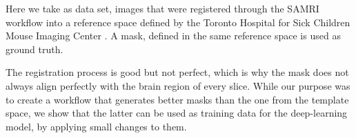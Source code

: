 Here we take as data set, images that were registered through the SAMRI workflow into a reference space defined by the Toronto Hospital for Sick Children Mouse Imaging Center \cite{dsu}.
A mask, defined in the same reference space is used as ground truth.

The registration process is good but not perfect, which is why the mask does not always align perfectly with the brain region of every slice.
While our purpose was to create a workflow that generates better masks than the one from the template space, we show that the latter can be used as training data for the deep-learning model, by applying small changes to them.
